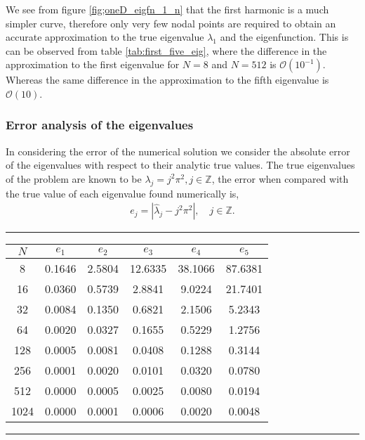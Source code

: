 \documentclass[a4paper, 12pt, twoside, openright]{article}
\numberwithin{equation}{section}
\begin{document}
We see from figure \ref{fig;oneD_eigfn_1_n} that the first harmonic is a much simpler curve, therefore only very few nodal points are required to obtain an accurate approximation to the true eigenvalue $\lambda_1$ and the eigenfunction. This is can be observed from table \ref{tab:first_five_eig}, where the difference in the approximation to the first eigenvalue for $N=8$ and $N=512$ is $\mathcal{O}(10^{-1})$. Whereas the same difference in the approximation to the fifth eigenvalue is $\mathcal{O}(10)$. %

\subsubsection{Error analysis of the eigenvalues}

In considering the error of the numerical solution we consider the absolute error of the eigenvalues with respect to their analytic true values. The true eigenvalues of the problem are known to be $\lambda_j = j^2\pi^2, j \in \mathbb{Z}$, the error when compared with the true value of each eigenvalue found numerically is,
\begin{align}
e_j = |\hat \lambda_j - j^2\pi^2|, \quad j \in \mathbb{Z}.
\end{align}
\begin{table}[H]
\centering
\rule{\linewidth}{1.5pt}
\bgroup
\def\arraystretch{1.25}
\begin{tabular}{ c@{\qquad} c@{\qquad} c@{\qquad} c@{\qquad} c@{\qquad} c@{\qquad} } 
$N$ & $e_1$ & $e_2$ & $e_3$ & $e _4$ & $e_5$\\\hline
 8 & 0.1646 & 2.5804 & 12.6335 & 38.1066 & 87.6381 \\
 16 & 0.0360 & 0.5739 & 2.8841 & 9.0224 & 21.7401 \\
 32 & 0.0084 & 0.1350 & 0.6821 & 2.1506 & 5.2343 \\
 64 & 0.0020 & 0.0327 & 0.1655 & 0.5229 & 1.2756 \\
 128 & 0.0005 & 0.0081 & 0.0408 & 0.1288 & 0.3144 \\
 256 & 0.0001 & 0.0020 & 0.0101 & 0.0320 & 0.0780 \\
 512 & 0.0000 & 0.0005 & 0.0025 & 0.0080 & 0.0194 \\
 1024 & 0.0000 & 0.0001 & 0.0006 & 0.0020 & 0.0048 \\ 
\end{tabular} 
\egroup
{}
\rule{\linewidth}{1.5pt}
\end{table}
\end{document}
